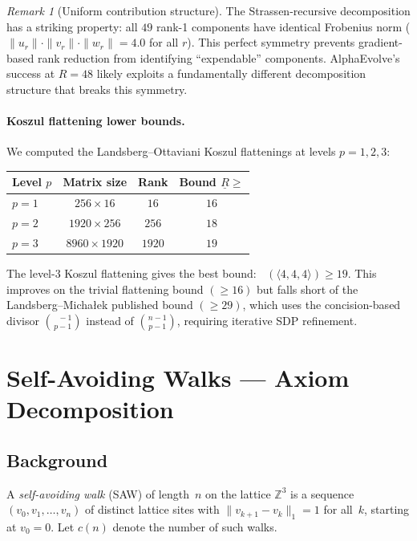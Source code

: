 \documentclass[11pt,a4paper]{article}
\theoremstyle{definition}
\theoremstyle{remark}
\newtheorem{remark}[theorem]{Remark}
\DeclareMathOperator{\brank}{\underline{R}}
\newcommand{\mmtensor}[3]{\langle #1, #2, #3 \rangle}
\begin{document}
\begin{remark}[Uniform contribution structure]
The Strassen-recursive decomposition has a striking property:
all $49$ rank-1 components have identical Frobenius norm
($\|u_r\| \cdot \|v_r\| \cdot \|w_r\| = 4.0$ for all $r$).
This perfect symmetry prevents gradient-based rank reduction
from identifying ``expendable'' components. AlphaEvolve's
success at $R = 48$ likely exploits a fundamentally different
decomposition structure that breaks this symmetry.
\end{remark}

\paragraph{Koszul flattening lower bounds.}
We computed the Landsberg--Ottaviani Koszul flattenings at levels
$p = 1, 2, 3$:
\begin{center}
\begin{tabular}{l|c|c|c}
\textbf{Level $p$} & \textbf{Matrix size} &
  \textbf{Rank} & \textbf{Bound $\underline{R} \ge$} \\ \hline
$p = 1$ & $256 \times 16$ & $16$ & $16$ \\
$p = 2$ & $1920 \times 256$ & $256$ & $18$ \\
$p = 3$ & $8960 \times 1920$ & $1920$ & $19$ \\
\end{tabular}
\end{center}
The level-$3$ Koszul flattening gives the best bound:
$\brank(\mmtensor{4}{4}{4}) \ge 19$. This improves on the trivial
flattening bound $(\ge 16)$ but falls short of the
Landsberg--Micha{\l}ek published bound $(\ge 29)$, which uses
the concision-based divisor $\binom{\brank - 1}{p - 1}$ instead
of $\binom{n - 1}{p - 1}$, requiring iterative SDP refinement.

\section{Self-Avoiding Walks --- Axiom Decomposition}\label{sec:saw}

\subsection{Background}

A \emph{self-avoiding walk} (SAW) of length~$n$ on the lattice
$\mathbb{Z}^3$ is a sequence $(v_0, v_1, \ldots, v_n)$ of distinct
lattice sites with $\|v_{k+1} - v_k\|_1 = 1$ for all~$k$, starting
at $v_0 = 0$. Let $c(n)$ denote the number of such walks.
\end{document}
